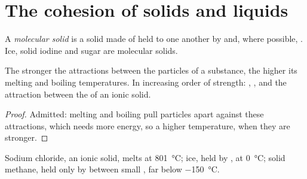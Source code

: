 \section{The cohesion of solids and liquids}

\begin{definition}\label{def:g11:polarity-and-cohesion:molecular-solid}
A \emph{molecular solid} is a solid made of
 held to one another by  and, where
possible, . Ice, solid iodine and sugar are molecular
solids.
\end{definition}

\begin{proposition}\label{prop:g11:polarity-and-cohesion:cohesion}
The stronger the attractions between the particles of a substance, the
higher its melting and boiling temperatures. In increasing order of
strength: , , and the attraction
between the  of an ionic solid.
\end{proposition}

\begin{proof}
Admitted: melting and boiling pull particles apart against these
attractions, which needs more energy, so a higher temperature, when
they are stronger.
\end{proof}

\begin{example}\label{ex:g11:polarity-and-cohesion:three}
Sodium chloride, an ionic solid, melts at \qty{801}{\celsius}; ice, held
by , at \qty{0}{\celsius}; solid methane, held only by  between small , far below
\qty{-150}{\celsius}.
\end{example}

